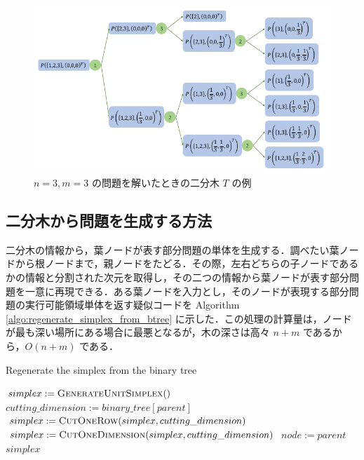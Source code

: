\documentclass[a4paper,11pt]{jreport}
\begin{document}
\begin{figure}
\begin{center}
\includegraphics[width=17cm]{graphs/simplex_tree.png}
\caption{$ n = 3, m = 3 $ の問題を解いたときの二分木 $ T $ の例}
\label{fig:simplex_tree}
\end{center}
\end{figure}

\subsection{二分木から問題を生成する方法} \label{sec:generate_problem_from_btree}

二分木の情報から，葉ノードが表す部分問題の単体を生成する．調べたい葉ノードから根ノードまで，親ノードをたどる．その際，左右どちらの子ノードであるかの情報と分割された次元を取得し，その二つの情報から葉ノードが表す部分問題を一意に再現できる．ある葉ノードを入力とし，そのノードが表現する部分問題の実行可能領域単体を返す疑似コードを Algorithm \ref{algo:regenerate_simplex_from_btree} に示した．この処理の計算量は，ノードが最も深い場所にある場合に最悪となるが，木の深さは高々 $ n + m $ であるから，$ O(n + m) $ である．\par

\begin{algorithm}
\caption{Regenerate the simplex from the binary tree}
\label{algo:regenerate_simplex_from_btree}
\begin{algorithmic}[1]
\State $ simplex := \Call{GenerateUnitSimplex} $
\State $ cutting\_dimension := binary\_tree[parent] $
\State $ simplex := \Call{CutOneRow}{simplex, cutting\_dimension} $
\State $ simplex := \Call{CutOneDimension}{simplex,  cutting\_dimension} $
\EndIf
\State $ node := parent $
\EndWhile
\State \Return $ simplex $
\EndFunction
\end{algorithmic}
\end{algorithm}
\end{document}
